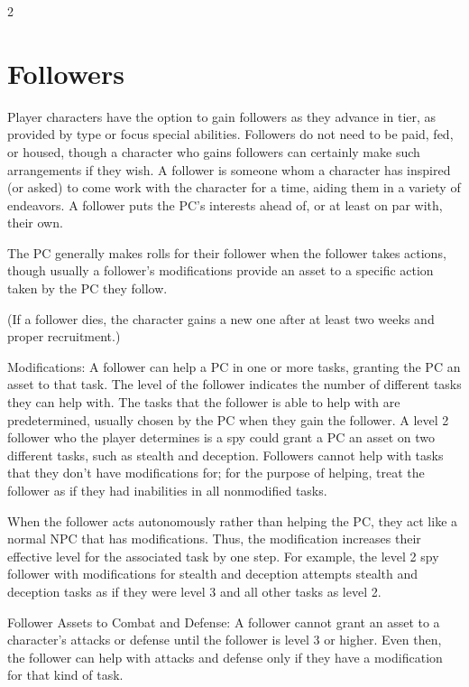 \begin{multicols}{2}

\chapter{Followers}

Player characters have the option to gain followers as they advance in tier, as provided by type or focus special abilities. Followers do not need to be paid, fed, or housed, though a character who gains followers can certainly make such arrangements if they wish. A follower is someone whom a character has inspired (or asked) to come work with the character for a time, aiding them in a variety of endeavors. A follower puts the PC’s interests ahead of, or at least on par with, their own.

The PC generally makes rolls for their follower when the follower takes actions, though usually a follower’s modifications provide an asset to a specific action taken by the PC they follow.

(If a follower dies, the character gains a new one after at least two weeks and proper recruitment.)

Modifications: A follower can help a PC in one or more tasks, granting the PC an asset to that task. The level of the follower indicates the number of different tasks they can help with. The tasks that the follower is able to help with are predetermined, usually chosen by the PC when they gain the follower. A level 2 follower who the player determines is a spy could grant a PC an asset on two different tasks, such as stealth and deception. Followers cannot help with tasks that they don’t have modifications for; for the purpose of helping, treat the follower as if they had inabilities in all nonmodified tasks.

When the follower acts autonomously rather than helping the PC, they act like a normal NPC that has modifications. Thus, the modification increases their effective level for the associated task by one step. For example, the level 2 spy follower with modifications for stealth and deception attempts stealth and deception tasks as if they were level 3 and all other tasks as level 2.

Follower Assets to Combat and Defense: A follower cannot grant an asset to a character’s attacks or defense until the follower is level 3 or higher. Even then, the follower can help with attacks and defense only if they have a modification for that kind of task.


\end{multicols}

